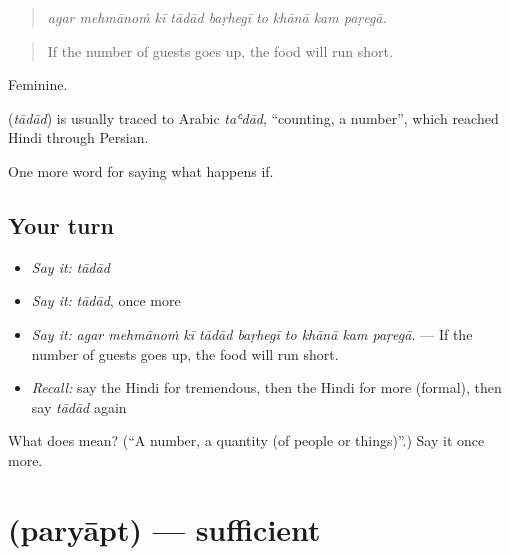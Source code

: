 \begin{quote}
\emph{agar mehmānoṁ kī tādād baṛhegī to khānā kam paṛegā.}
\end{quote}

\begin{quote}
If the number of guests goes up, the food will run short.
\end{quote}

Feminine.

\begin{cousinweb}
\textbf{} (\emph{tādād}) is usually traced to Arabic \emph{taʿdād}, \textquotedblleft{}counting, a number\textquotedblright{}, which reached Hindi through Persian.
\end{cousinweb}

\begin{grammarlens}[title={What you've built}]
One more word for saying what happens if.
\end{grammarlens}

\subsection*{Your turn}
\begin{itemize}
\raggedright
  \item \emph{Say it:} \emph{tādād}
  \item \emph{Say it:} \emph{tādād}, once more
  \item \emph{Say it:} \emph{agar mehmānoṁ kī tādād baṛhegī to khānā kam paṛegā.} — If the number of guests goes up, the food will run short.
  \item \emph{Recall:} say the Hindi for tremendous, then the Hindi for more (formal), then say \emph{tādād} again
\end{itemize}

\begin{tcolorbox}[breakable,colback=teal!4,colframe=teal!35!black,title={Before you move on}]
What does  mean? (\textquotedblleft{}A number, a quantity (of people or things)\textquotedblright{}.) Say it once more.
\end{tcolorbox}
\section[\texorpdfstring{\hi{पर्याप्त} (paryāpt)}{पर्याप्त (paryāpt)}]{ (paryāpt) — sufficient}

\label{lesson:HI-C388-paryapt}



